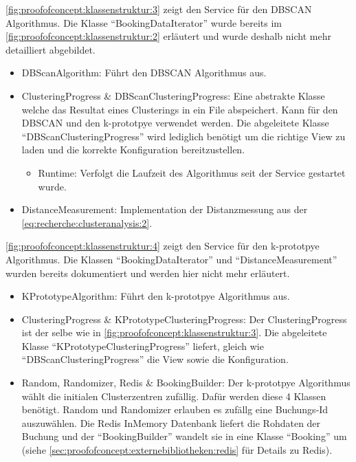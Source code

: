 \cref{fig:proofofconcept:klassenstruktur:3} zeigt den Service für den DBSCAN Algorithmus. Die Klasse "`BookingDataIterator"' wurde bereits im \cref{fig:proofofconcept:klassenstruktur:2} erläutert und wurde deshalb nicht mehr detailliert abgebildet.
\begin{itemize}
	\item DBScanAlgorithm: Führt den DBSCAN Algorithmus aus. 
	\item ClusteringProgress \& DBScanClusteringProgress: Eine abstrakte Klasse welche das Resultat eines Clusterings in ein File abspeichert. Kann für den DBSCAN und den k-prototpye verwendet werden. Die abgeleitete Klasse "`DBScanClusteringProgress"' wird lediglich benötigt um die richtige View zu laden und die korrekte Konfiguration bereitzustellen.
	\begin{itemize}
		\item Runtime: Verfolgt die Laufzeit des Algorithmus seit der Service gestartet wurde. 
	\end{itemize}
	\item DistanceMeasurement: Implementation der Distanzmessung aus der \cref{eq:recherche:clusteranalysis:2}.
\end{itemize}

\cref{fig:proofofconcept:klassenstruktur:4} zeigt den Service für den k-prototpye Algorithmus. Die Klassen "`BookingDataIterator"' und "`DistanceMeasurement"' wurden bereits dokumentiert und werden hier nicht mehr erläutert.
\begin{itemize}
	\item KPrototypeAlgorithm: Führt den k-prototpye Algorithmus aus. 
	\item ClusteringProgress \& KPrototypeClusteringProgress: Der ClusteringProgress ist der selbe wie in \cref{fig:proofofconcept:klassenstruktur:3}. Die abgeleitete Klasse "`KPrototypeClusteringProgress"' liefert, gleich wie "`DBScanClusteringProgress"' die View sowie die Konfiguration. 
	\item Random, Randomizer, Redis \& BookingBuilder: Der k-prototpye Algorithmus wählt die initialen Clusterzentren zufällig. Dafür werden diese 4 Klassen benötigt. Random und Randomizer erlauben es zufällg eine Buchungs-Id auszuwählen. Die Redis InMemory Datenbank liefert die Rohdaten der Buchung und der "`BookingBuilder"' wandelt sie in eine Klasse "`Booking"' um (siehe \cref{sec:proofofconcept:externebibliotheken:redis}  für Details zu Redis).
\end{itemize}

